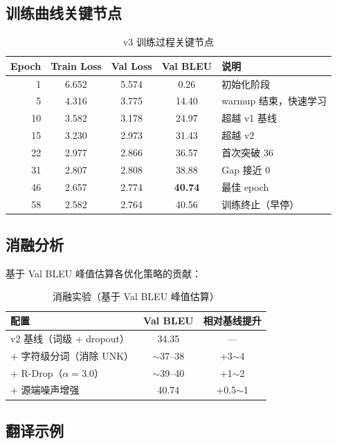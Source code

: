 \documentclass[12pt, a4paper]{ctexart}
\begin{document}
\subsection{训练曲线关键节点}

\begin{table}[H]
\centering
\caption{v3 训练过程关键节点}
\begin{tabular}{rcccl}
\toprule
\textbf{Epoch} & \textbf{Train Loss} & \textbf{Val Loss} & \textbf{Val BLEU} & \textbf{说明} \\
\midrule
1  & 6.652 & 5.574 & 0.26  & 初始化阶段 \\
5  & 4.316 & 3.775 & 14.40 & warmup 结束，快速学习 \\
10 & 3.582 & 3.178 & 24.97 & 超越 v1 基线 \\
15 & 3.230 & 2.973 & 31.43 & 超越 v2 \\
22 & 2.977 & 2.866 & 36.57 & 首次突破 36 \\
31 & 2.807 & 2.808 & 38.88 & Gap 接近 0 \\
46 & 2.657 & 2.774 & \textbf{40.74} & 最佳 epoch \\
58 & 2.582 & 2.764 & 40.56 & 训练终止（早停） \\
\bottomrule
\end{tabular}
\end{table}

\subsection{消融分析}

基于 Val BLEU 峰值估算各优化策略的贡献：

\begin{table}[H]
\centering
\caption{消融实验（基于 Val BLEU 峰值估算）}
\begin{tabular}{lcc}
\toprule
\textbf{配置} & \textbf{Val BLEU} & \textbf{相对基线提升} \\
\midrule
v2 基线（词级 + dropout）    & 34.35   & ---       \\
+ 字符级分词（消除 UNK）     & $\sim$37--38 & +3$\sim$4 \\
+ R-Drop（$\alpha=3.0$）     & $\sim$39--40 & +1$\sim$2 \\
+ 源端噪声增强               & 40.74   & +0.5$\sim$1 \\
\bottomrule
\end{tabular}
\end{table}

\subsection{翻译示例}
\end{document}
